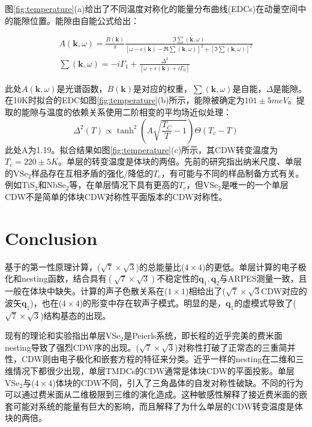 \documentclass[reprint, aps, prb, showkeys]{revtex4-2}
\begin{document}
图\ref{fig:temperature}(a)给出了不同温度对称化的能量分布曲线(EDCs)在动量空间中的能隙位置。能隙由自能公式给出：
\begin{widetext}
\begin{eqnarray}
    A(\boldsymbol{k}, \omega) = \frac{B(\boldsymbol{k})}{\pi} \frac{\Im \sum (\boldsymbol{k}, \omega)}{\left[ \omega - \epsilon(\boldsymbol{k}) - \Re \sum (\boldsymbol{k}, \omega)\right]^2 + \left[ \Im \sum (\boldsymbol{k}, \omega) \right]^2} \\
    \sum (\boldsymbol{k}, \omega) = -i \Gamma_1 + \frac{\Delta^2}{\left[ \omega + \epsilon(\boldsymbol{k}) + i \Gamma_0 \right]}
\end{eqnarray}
\end{widetext}
此处$A(\boldsymbol{k}, \omega)$是光谱函数，$B(\boldsymbol{k})$是对应的权重，$\sum (\boldsymbol{k}, \omega)$是自能，$\Delta$是能隙。在10K时拟合的EDC如图\ref{fig:temperature}(b)所示，能隙被确定为$101 \pm 5 meV$。提取的能隙与温度的依赖关系使用二阶相变的平均场近似处理：
\begin{equation}
    \Delta^2(T) \propto \tanh^2 \left( A\sqrt{\frac{T_C}{T} - 1}\right) \Theta(T_c - T) 
\end{equation}
此处A为1.19。拟合结果如图\ref{fig:temperature}(c)所示，其CDW转变温度为$T_c = 220 \pm 5 K$。单层的转变温度是体块的两倍。先前的研究指出纳米尺度、单层的VSe$_2$样品存在互相矛盾的强化/降低的$T_c$，有可能与不同的样品制备方式有关。例如TiS$_2$和NbSe$_2$等，在单层情况下具有更高的$T_c$，但VSe$_2$是唯一的一个单层CDW不是简单的体块CDW对称性平面版本的CDW对称性。
\section{Conclusion}
基于的第一性原理计算，($\sqrt{7} \times \sqrt{3}$)的总能量比($4 \times 4$)的更低。单层计算的电子极化和nesting函数，结合具有$(\sqrt{7} \times \sqrt{3})$不稳定性的$\boldsymbol{q}_1, \boldsymbol{q}_2$与ARPES测量一致，且一般在体块中缺失。计算的声子色散关系在($1 \times 1$)相给出了($\sqrt{7} \times \sqrt{3}$CDW对应的波矢$\boldsymbol{q}_1$)，也在($4 \times 4$)的形变中存在软声子模式。明显的是，$\boldsymbol{q}_1$的虚模式导致了($\sqrt{7} \times \sqrt{3}$)结构基态的出现。

现有的理论和实验指出单层VSe$_2$是Peierls系统，即长程的近乎完美的费米面nesting导致了强烈CDW序的出现。($\sqrt{7} \times \sqrt{3}$)对称性打破了正常态的三重简并性，CDW则由电子极化和嵌套方程的特征来分类。近乎一样的nesting在二维和三维情况下都很少出现，单层TMDCs的CDW通常是体块CDW的平面投影。单层VSe$_2$与($4 \times 4$)体块的CDW不同，引入了三角晶体的自发对称性破缺。不同的行为可以通过费米面从二维极限到三维的演化造成。这种敏感性解释了接近费米面的嵌套可能对系统的能量有巨大的影响，而且解释了为什么单层的CDW转变温度是体块的两倍。
\end{document}
